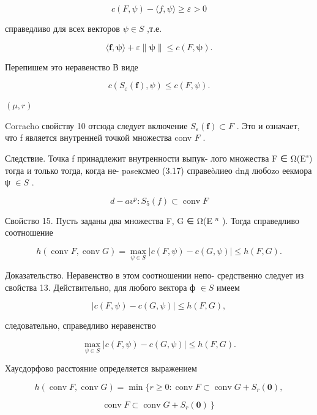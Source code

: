 \documentclass[8pt]{extarticle}
\begin{document}
\[
c\left( {F,\psi }\right)  - \langle f,\psi \rangle  \geq  \varepsilon  > 0
\]

справедливо для всех векторов \(\psi  \in  S\) ,т.е.

\[
\langle \mathbf{f},\mathbf{\psi }\rangle  + \varepsilon \parallel \mathbf{\psi }\parallel  \leq  c\left( {F,\mathbf{\psi }}\right) .
\]

Перепишем это неравенство В виде

\[
c\left( {{S}_{\varepsilon }\left( \mathbf{f}\right) ,\psi }\right)  \leq  c\left( {F,\psi }\right) .
\]

\(\left( {\mu ,r}\right)\)

Corracho свойству 10 отсюда следует включение \({S}_{\varepsilon }\left( \mathbf{f}\right)  \subset  F\) . Это и означает, что f является внутренней точкой множества conv \(F\) .

Следствие. Точка f принадлежит внутренности выпук- лого множества F ∈ Ω(E") тогда и только тогда, когда не- paseксмео (3.17) справеòлиео dnд любоzo еекмора ψ \(\in  S\) .

\[
d - a{v}^{p} : {S}_{5}\left( f\right)  \subset  \operatorname{conv}F
\]

Свойство 15. Пусть заданы два множества F, G ∈ Ω(E \({}^{n}\) ). Тогда справедливо соотношение

\[
h\left( {\operatorname{conv}F,\operatorname{conv}G}\right)  = \mathop{\max }\limits_{{\psi  \in  S}}\left| {c\left( {F,\psi }\right)  - c\left( {G,\psi }\right) }\right|  \leq  h\left( {F,G}\right) . \tag{3.18}
\]

Доказательство. Неравенство в этом соотношении непо- средственно следует из свойства 13. Действительно, для любого вектора ф \(\in  S\) имеем

\[
\left| {c\left( {F,\psi }\right)  - c\left( {G,\psi }\right) }\right|  \leq  h\left( {F,G}\right) ,
\]

следовательно, справедливо неравенство

\[
\mathop{\max }\limits_{{\psi  \in  S}}\left| {c\left( {F,\psi }\right)  - c\left( {G,\psi }\right) }\right|  \leq  h\left( {F,G}\right) .
\]

Хаусдорфово расстояние определяется выражением

\[
h\left( {\operatorname{conv}F,\operatorname{conv}G}\right)  = \min \{ r \geq  0 : \operatorname{conv}F \subset  \operatorname{conv}G + {S}_{r}\left( \mathbf{0}\right) ,
\]

\[
\left. {\operatorname{conv}F \subset  \operatorname{conv}G + {S}_{r}\left( \mathbf{0}\right) }\right\}
\]
\end{document}
